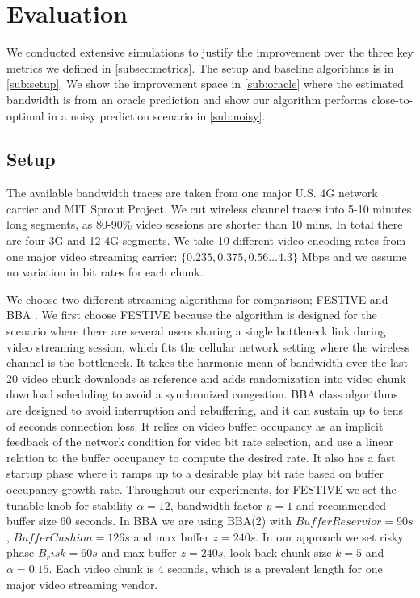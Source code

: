 

\section{Evaluation} \label{sec:evaluation}
We conducted extensive simulations to justify the improvement over the three key metrics we defined in \autoref{subsec:metrics}. The setup and baseline algorithms is in \autoref{sub:setup}. We show the improvement space in \autoref{sub:oracle} where the estimated bandwidth is from an oracle prediction and show our algorithm performs close-to-optimal in a noisy prediction scenario in \autoref{sub:noisy}. 

\subsection{Setup} \label{sub:setup}
 The available bandwidth traces are taken from one major U.S. 4G network carrier and MIT Sprout Project\cite{Sprout}. We cut wireless channel traces into 5-10 minutes long segments, as 80-90\% video sessions are shorter than 10 mins\cite{ATTVIDEO}. In total there are four 3G and 12 4G segments. We take 10 different video encoding rates from one major video streaming carrier: $\{0.235,0.375, 0.56\dots4.3\}$ Mbps \cite{NETFLIXRATE} and we assume no variation in bit rates for each chunk. 

We choose two different streaming algorithms for comparison; FESTIVE \cite{Festive} and BBA \cite{BBA}. We first choose FESTIVE because the algorithm is designed for the scenario where there are several users sharing a single bottleneck link during video streaming session, which fits the cellular network setting where the wireless channel is the bottleneck. It takes the harmonic mean of bandwidth over the last 20 video chunk downloads as reference and adds randomization into video chunk download scheduling to avoid a synchronized congestion. BBA class algorithms are designed to avoid interruption and rebuffering, and it can sustain up to tens of seconds connection loss. It relies on video buffer occupancy as an implicit feedback of the network condition for video bit rate selection, and use a linear relation to the buffer occupancy to compute the desired rate. It also has a fast startup phase where it ramps up to a desirable play bit rate based on buffer occupancy growth rate. Throughout our experiments, for FESTIVE we set the tunable knob for stability $\alpha =12 $, bandwidth factor $p=1$ and recommended buffer size 60 seconds. In BBA we are using BBA(2) with $BufferReservior=90s$, $BufferCushion=126s$ and max buffer $z=240s$. In our approach we set risky phase $B_risk=60s$ and max buffer $z=240s$, look back chunk size $k=5$ and $\alpha=0.15$. Each video chunk is 4 seconds, which is a prevalent length for one major video streaming vendor. 



